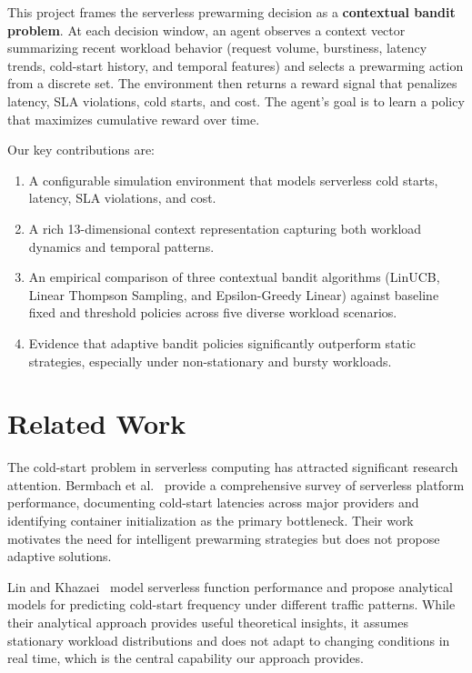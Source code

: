 \documentclass[11pt]{article}
\begin{document}
This project frames the serverless prewarming decision as a \textbf{contextual bandit problem}. At each decision window, an agent observes a context vector summarizing recent workload behavior (request volume, burstiness, latency trends, cold-start history, and temporal features) and selects a prewarming action from a discrete set. The environment then returns a reward signal that penalizes latency, SLA violations, cold starts, and cost. The agent's goal is to learn a policy that maximizes cumulative reward over time.

Our key contributions are:
\begin{enumerate}[nosep]
    \item A configurable simulation environment that models serverless cold starts, latency, SLA violations, and cost.
    \item A rich 13-dimensional context representation capturing both workload dynamics and temporal patterns.
    \item An empirical comparison of three contextual bandit algorithms (LinUCB, Linear Thompson Sampling, and Epsilon-Greedy Linear) against baseline fixed and threshold policies across five diverse workload scenarios.
    \item Evidence that adaptive bandit policies significantly outperform static strategies, especially under non-stationary and bursty workloads.
\end{enumerate}

\section{Related Work}

The cold-start problem in serverless computing has attracted significant research attention. Bermbach et al.~\cite{bermbach2020} provide a comprehensive survey of serverless platform performance, documenting cold-start latencies across major providers and identifying container initialization as the primary bottleneck. Their work motivates the need for intelligent prewarming strategies but does not propose adaptive solutions.

Lin and Khazaei~\cite{lin2020} model serverless function performance and propose analytical models for predicting cold-start frequency under different traffic patterns. While their analytical approach provides useful theoretical insights, it assumes stationary workload distributions and does not adapt to changing conditions in real time, which is the central capability our approach provides.
\end{document}
